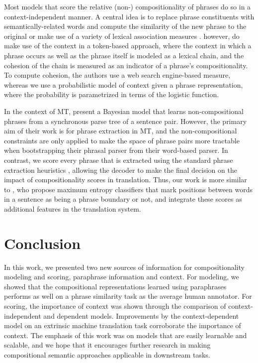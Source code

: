 \documentclass[11pt,letterpaper]{article}
\begin{document}
Most models that score the relative (non-) compositionality of phrases do so in a context-independent manner. 
A central idea is to replace phrase constituents with semantically-related words and compute the similarity of the new phrase to the original \cite{Kiela2013,Salehi2014} or make use of a variety of lexical association measures \cite{Lin1999,Pecina2006}. 
 however, do make use of the context in a token-based approach, where the context in which a phrase occurs as well as the phrase itself is modeled as a lexical chain, and the cohesion of the chain is measured as an indicator of a phrase's compositionality. 
To compute cohesion, the authors use a web search engine-based measure, whereas we use a probabilistic model of context given a phrase representation, where the probability is parametrized in terms of the logistic function.  

In the context of MT,  present a Bayesian model that learns non-compositional phrases from a synchronous parse tree of a sentence pair.
However, the primary aim of their work is for phrase extraction in MT, and the non-compositional constraints are only applied to make the space of phrase pairs more tractable when bootstrapping their phrasal parser from their word-based parser. 
In contrast, we score every phrase that is extracted using the standard phrase extraction heuristics \cite{Chiang2007}, allowing the decoder to make the final decision on the impact of compositionality scores in translation. 
Thus, our work is more similar to , who propose maximum entropy classifiers that mark positions between words in a sentence as being a phrase boundary or not, and integrate these scores as additional features in the translation system.  

\section{Conclusion}

In this work, we presented two new sources of information for compositionality modeling and scoring, paraphrase information and context. 
For modeling, we showed that the compositional representations learned using paraphrases performs as well on a phrase similarity task as the average human annotator.
For scoring, the importance of context was shown through the comparison of context-independent and dependent models. 
Improvements by the context-dependent model on an extrinsic machine translation task corroborate the importance of context. 
The emphasis of this work was on models that are easily learnable and scalable, and we hope that it encourages further research in making compositional semantic approaches applicable in downstream tasks. 



\end{document}
